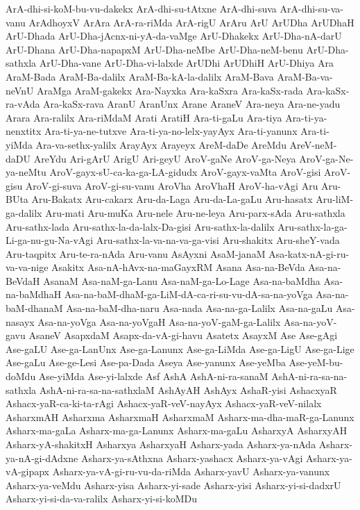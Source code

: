 {ArA-dhi-si-koM-bu-vu-dakekx
ArA-dhi-su-tAtxne
ArA-dhi-suva
ArA-dhi-su-va-vanu
ArAdhoyxV
ArAra
ArA-ra-riMda
ArA-rigU
ArAru
ArU
ArUDha
ArUDhaH
ArU-Dhada
ArU-Dha-jAcnx-ni-yA-da-vaMge
ArU-Dhakekx
ArU-Dha-nA-darU
ArU-Dhana
ArU-Dha-napapxM
ArU-Dha-neMbe
ArU-Dha-neM-benu
ArU-Dha-sathxla
ArU-Dha-vane
ArU-Dha-vi-lalxde
ArUDhi
ArUDhiH
ArU-Dhiya
Ara
AraM-Bada
AraM-Ba-dalilx
AraM-Ba-kA-la-dalilx
AraM-Bava
AraM-Ba-va-neVnU
AraMga
AraM-gakekx
Ara-Nayxka
Ara-kaSxra
Ara-kaSx-rada
Ara-kaSx-ra-vAda
Ara-kaSx-rava
AranU
AranUnx
Arane
AraneV
Ara-neya
Ara-ne-yadu
Arara
Ara-ralilx
Ara-riMdaM
Arati
AratiH
Ara-ti-gaLu
Ara-tiya
Ara-ti-ya-nenxtitx
Ara-ti-ya-ne-tutxve
Ara-ti-ya-no-lelx-yayAyx
Ara-ti-yanunx
Ara-ti-yiMda
Ara-va-sethx-yalilx
ArayAyx
Arayeyx
AreM-daDe
AreMdu
AreV-neM-daDU
AreYdu
Ari-gArU
ArigU
Ari-geyU
AroV-gaNe
AroV-ga-Neya
AroV-ga-Ne-ya-neMtu
AroV-gayx-sU-ca-ka-ga-LA-gidudx
AroV-gayx-vaMta
AroV-gisi
AroV-gisu
AroV-gi-suva
AroV-gi-su-vanu
AroVha
AroVhaH
AroV-ha-vAgi
Aru
Aru-BUta
Aru-Bakatx
Aru-cakarx
Aru-da-Laga
Aru-da-La-gaLu
Aru-hasatx
Aru-liM-ga-dalilx
Aru-mati
Aru-muKa
Aru-nele
Aru-ne-leya
Aru-parx-sAda
Aru-sathxla
Aru-sathx-lada
Aru-sathx-la-da-lalx-Da-gisi
Aru-sathx-la-dalilx
Aru-sathx-la-ga-Li-ga-nu-gu-Na-vAgi
Aru-sathx-la-va-na-va-ga-visi
Aru-shakitx
Aru-sheY-vada
Aru-taqpitx
Aru-te-ra-nAda
Aru-vanu
AsAyxni
AsaM-janaM
Asa-katx-nA-gi-ru-va-va-nige
Asakitx
Asa-nA-hAvx-na-maGayxRM
Asana
Asa-na-BeVda
Asa-na-BeVdaH
AsanaM
Asa-naM-ga-Lanu
Asa-naM-ga-Lo-Lage
Asa-na-baMdha
Asa-na-baMdhaH
Asa-na-baM-dhaM-ga-LiM-dA-ca-ri-su-vu-dA-sa-na-yoVga
Asa-na-baM-dhanaM
Asa-na-baM-dha-naru
Asa-nada
Asa-na-ga-Lalilx
Asa-na-gaLu
Asa-nasayx
Asa-na-yoVga
Asa-na-yoVgaH
Asa-na-yoV-gaM-ga-Lalilx
Asa-na-yoV-gavu
AsaneV
AsapxdaM
Asapx-da-vA-gi-havu
Asatetx
AsayxM
Ase
Ase-gAgi
Ase-gaLU
Ase-ga-LanUnx
Ase-ga-Lanunx
Ase-ga-LiMda
Ase-ga-LigU
Ase-ga-Lige
Ase-gaLu
Ase-ge-Lesi
Ase-pa-Dada
Aseya
Ase-yanunx
Ase-yeMba
Ase-yeM-bu-doMdu
Ase-yiMda
Ase-yi-lalxde
Asf
AshA
AshA-ni-ra-sanaM
AshA-ni-ra-sa-na-sathxla
AshA-ni-ra-sa-na-sathxlaM
AshAyAH
AshAyx
AshaR-yisi
AshacxyaR
Ashacx-yaR-ca-ki-ta-rAgi
Ashacx-yaR-veV-nayAyx
Ashacx-yaR-veV-nilalx
AsharxmAH
Asharxma
AsharxmaH
AsharxmaM
Asharx-ma-dha-maR-ga-Lanunx
Asharx-ma-gaLa
Asharx-ma-ga-Lanunx
Asharx-ma-gaLu
AsharxyA
AsharxyAH
Asharx-yA-shakitxH
Asharxya
AsharxyaH
Asharx-yada
Asharx-ya-nAda
Asharx-ya-nA-gi-dAdxne
Asharx-ya-sAthxna
Asharx-yashacx
Asharx-ya-vAgi
Asharx-ya-vA-gipapx
Asharx-ya-vA-gi-ru-vu-da-riMda
Asharx-yavU
Asharx-ya-vanunx
Asharx-ya-veMdu
Asharx-yisa
Asharx-yi-sade
Asharx-yisi
Asharx-yi-si-dadxrU
Asharx-yi-si-da-va-ralilx
Asharx-yi-si-koMDu
}
